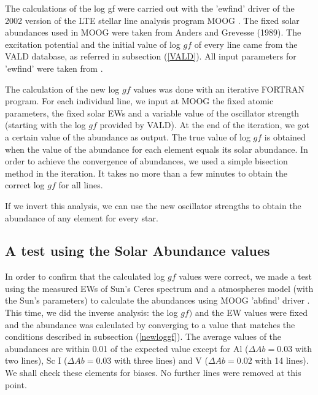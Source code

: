 \documentclass[dvips,12pt,a4paper]{report}
\begin{document}
{The calculations of the log gf were carried out with the 'ewfind' driver of the 2002 version of the LTE stellar line analysis program MOOG \citep{Sneden-1973}. The fixed solar abundances used in MOOG were taken from Anders and Grevesse (1989). The excitation potential and the initial value of log $gf$ of every line came from the VALD database, as referred in subsection (\ref{VALD}). All input parameters for 'ewfind' were taken from \citet{Santos-2004b}. 



The calculation of the new log $gf$ values was done with an iterative FORTRAN program. For each individual line, we input at MOOG the fixed atomic parameters, the fixed solar EWs and a variable value of the oscillator strength (starting with the log $gf$ provided by VALD). At the end of the iteration, we got a certain value of the abundance as output. The true value of log $gf$ is obtained when the value of the abundance for each element equals its solar abundance. %
In order to achieve the convergence of abundances, we used a simple bisection method in the iteration. It takes no more than a few minutes to obtain the correct log $gf$ for all lines. 

If we invert this analysis, we can use the new oscillator strengths to obtain the abundance of any element for every star. %

\subsection {A test using the Solar Abundance values}

In order to confirm that the calculated log $gf$ values were correct, we made a test using the measured EWs of Sun's Ceres spectrum and a \citet{Kurucz-1993} atmospheres model (with the Sun's parameters) to calculate the abundances using MOOG 'abfind' driver . This time, we did the inverse analysis: the log $gf)$ and the EW values were fixed and the abundance was calculated by converging to a value that matches the conditions described in subsection (\ref{newloggf}). The average values of the abundances are within 0.01 of the expected value except for Al ($\Delta Ab= 0.03$ with two lines), Sc I ($\Delta Ab=0.03$ with three lines) and V ($\Delta Ab=0.02$ with 14 lines). We shall check these elements for biases. No further lines were removed at this point. %

}
\end{document}
